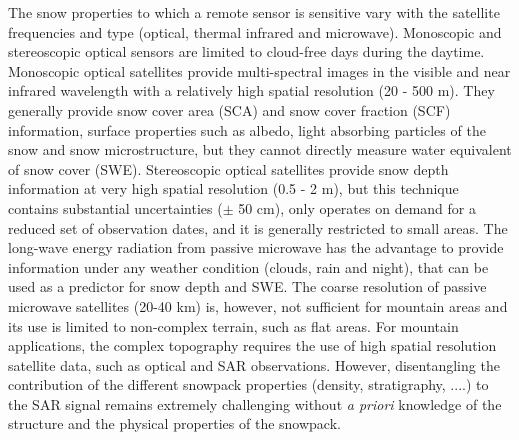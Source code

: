 \documentclass[utf8]{frontiersSCNS} %
\begin{document}
The snow properties to which a remote sensor is sensitive vary with the satellite frequencies and type (optical, thermal infrared and microwave). Monoscopic and stereoscopic optical sensors are limited to cloud-free days during the daytime. Monoscopic optical satellites provide multi-spectral images in the visible and near infrared wavelength with a relatively high spatial resolution (20 - 500 m). They generally provide snow cover area (SCA) and snow cover fraction (SCF) information, surface properties such as albedo, light absorbing particles of the snow and snow microstructure, but they cannot directly measure water equivalent of snow cover (SWE). Stereoscopic optical satellites provide snow depth information at very high spatial resolution (0.5 - 2 m), but this technique contains substantial uncertainties ($\pm$ 50 cm), only operates on demand for a reduced set of observation dates, and it is generally restricted to small areas. The long-wave energy radiation from passive microwave has the advantage to provide information under any weather condition (clouds, rain and night), that can be used as a predictor for snow depth and SWE. The coarse resolution of passive microwave satellites (20-40 km) is, however, not sufficient for mountain areas and its use is limited to non-complex terrain, such as flat areas. %
For mountain applications, the complex topography requires the use of high spatial resolution satellite data, such as optical and SAR observations. %
However, disentangling the contribution of the different snowpack properties (density, stratigraphy, ....) to the SAR signal remains extremely challenging without \textit{a priori} knowledge of the structure and the physical properties of the snowpack.


\end{document}
